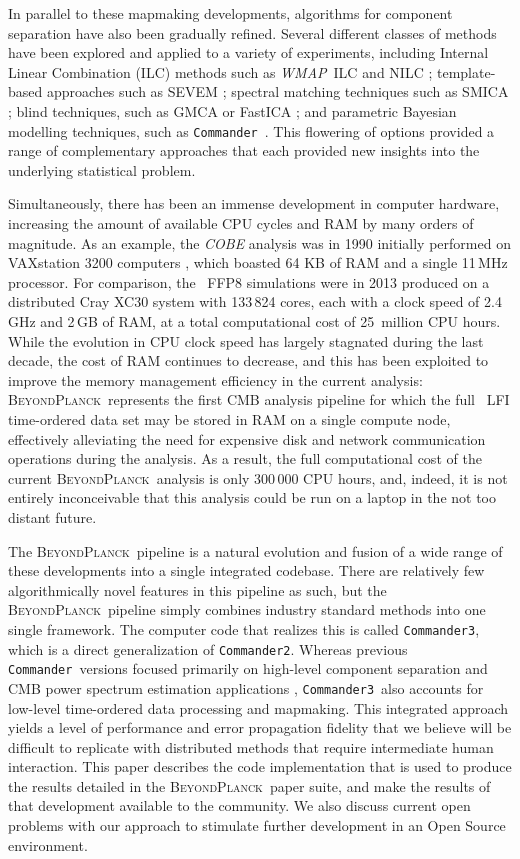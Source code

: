 \documentclass[twocolumn]{aa}
\def\WMAP{\emph{WMAP}}
\def\commander{\texttt{Commander}}
\def\commandertwo{\texttt{Commander2}}
\def\commanderthree{\texttt{Commander3}}
\newcommand{\BP}{\textsc{BeyondPlanck}}
\begin{document}
In parallel to these mapmaking developments, algorithms for component
separation have also been gradually refined. Several different classes of
methods have been explored and applied to a variety of experiments,
including Internal Linear Combination (ILC) methods such as \WMAP\ ILC
\citep{WMAPilc1,WMAPilc2} and NILC \citep{NILC}; template-based
approaches such as SEVEM \citep{SEVEM}; spectral matching techniques
such as SMICA \citep{SMICA}; blind techniques, such as GMCA
\citep{GMCA} or FastICA \cite{fastICA}; and parametric Bayesian
modelling techniques, such as
\commander\ \citep{eriksen:2004,commander,seljebotn:2019}. This
flowering of options provided a range of complementary approaches that
each provided new insights into the underlying statistical problem.

Simultaneously, there has been an immense development in computer
hardware, increasing the amount of available CPU cycles and RAM by
many orders of magnitude. As an example, the \emph{COBE} analysis was
in 1990 initially performed on VAXstation 3200 computers
\citep{cobeprocessing}, which boasted 64 KB of RAM and a single
11\,MHz processor. For comparison, the \Planck\ FFP8 simulations
\citep{planck2014-a14} were in 2013 produced on a distributed Cray
XC30 system with 133\,824 cores, each with a clock speed of 2.4\,GHz
and 2\,GB of RAM, at a total computational cost of 25\, million CPU
hours. While the evolution in CPU clock speed has largely stagnated
during the last decade, the cost of RAM continues to decrease, and
this has been exploited to improve the memory management efficiency in
the current analysis: \BP\ represents the first CMB analysis pipeline
for which the full \Planck\ LFI time-ordered data set may be stored in
RAM on a single compute node, effectively alleviating the need for
expensive disk and network communication operations during the
analysis. As a result, the full computational cost of the current
\BP\ analysis is only 300\,000 CPU hours, and, indeed, it is not
entirely inconceivable that this analysis could be run on a laptop in
the not too distant future.

The \BP\ pipeline is a natural evolution and fusion of a wide range of
these developments into a single integrated codebase. There are
relatively few algorithmically novel features in this pipeline as
such, but the \BP\ pipeline simply combines industry standard methods
into one single framework. The computer code that realizes this is
called \commanderthree, which is a direct generalization of
\commandertwo. Whereas previous \commander\ versions focused primarily
on high-level component separation and CMB power spectrum estimation
applications \citep{eriksen:2004,eriksen2008,seljebotn:2019},
\commanderthree\ also accounts for low-level time-ordered data
processing and mapmaking. This integrated approach yields a level of
performance and error propagation fidelity that we believe will be
difficult to replicate with distributed methods that require
intermediate human interaction. This paper describes the code
implementation that is used to produce the results detailed in the
\BP\ paper suite, and make the results of that development available
to the community. We also discuss current open problems with our
approach to stimulate further development in an Open Source
environment.
\end{document}
